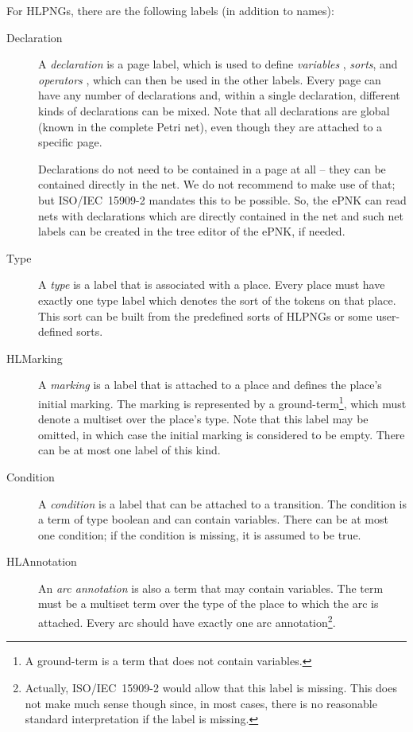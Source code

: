 For HLPNGs, there are the following labels (in addition to names):
\begin{description}
  \item[Declaration] A \emph{declaration}%
is a page label, which is used
     to define \emph{variables}%
, \emph{sorts},%
     and \emph{operators}%
, which can then be used in the other labels.  Every page can have
     any number of declarations and, within a single declaration,
     different kinds of declarations can be mixed. Note that all
     declarations are global (known in the complete Petri net),
     even though they are attached to a specific page.
     
     Declarations do not need to be contained in a page at all --
     they can be contained directly in the net. We do not recommend
     to make use of that; but ISO/IEC~15909-2 mandates
     this to be possible. So, the ePNK can read nets with declarations
     which are directly contained in the net and such net labels can
     be created in the tree editor of the ePNK, if needed.

  \item[Type] A \emph{type}%
     is a label that is associated with a place.
     Every place must have exactly one type label which denotes
     the sort of the tokens on that place. This sort can be built
     from the predefined sorts of HLPNGs or some user-defined sorts.

  \item[HLMarking] A \emph{marking}%
     is a label that is attached to a place
     and defines the place's initial marking. The marking is
     represented by a ground-term\footnote
      {A ground-term is a term that does not contain variables.},
     which must denote a multiset over the place's type. Note that this
     label may be omitted, in which case the initial marking is
     considered to be empty. There can be at most one label of this
     kind.

  \item[Condition] A \emph{condition}%
     is a label that can be attached
     to a transition. The condition is a term of type boolean and
     can contain variables. There can be at most one condition;
     if the condition is missing, it is assumed to be true.

  \item[HLAnnotation] An \emph{arc annotation}%
     is also a term that may
     contain variables. The term must be a multiset term over the
     type of the place to which the arc is attached. Every arc should
     have exactly one arc annotation\footnote
     {Actually, ISO/IEC~15909-2 would allow that this label is
      missing. This does not make much sense though since, in most cases,
      there is no reasonable standard interpretation if the label is
      missing.}.
\end{description} 

